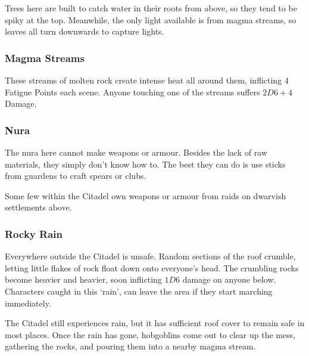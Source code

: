 \begin{multicols}{2}
Trees here are built to catch water in their roots from above, so they tend to be spiky at the top.  Meanwhile, the only light available is from magma streams, so leaves all turn downwards to capture lights.

\subsubsection{Magma Streams}

These streams of molten rock create intense heat all around them, inflicting 4 Fatigue Points each scene.
Anyone touching one of the streams suffers $2D6+4$ Damage.

\subsubsection{Nura}

The nura here cannot make weapons or armour.
Besides the lack of raw materials, they simply don't know how to.
The best they can do is use sticks from guardens to craft spears or clubs.

Some few within the Citadel own weapons or armour from raids on dwarvish settlements above.

\subsubsection{Rocky Rain}

Everywhere outside the Citadel is unsafe.
Random sections of the roof crumble, letting little flakes of rock float down onto everyone's head.
The crumbling rocks become heavier and heavier, soon inflicting $1D6$ damage on anyone below.
Characters caught in this `rain', can leave the area if they start marching immediately.

The Citadel still experiences rain, but it has sufficient roof cover to remain safe in most places.
Once the rain has gone, hobgoblins come out to clear up the mess, gathering the rocks, and pouring them into a nearby magma stream.


\end{multicols}
